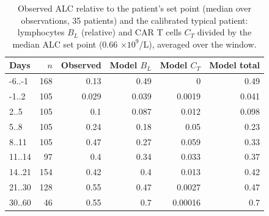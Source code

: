 \begin{table}[!htbp]
\centering
\small
\setlength{\tabcolsep}{3.5pt}
\caption{Observed ALC relative to the patient's set point (median over observations, 35 patients) and the calibrated typical patient: lymphocytes $B_L$ (relative) and CAR T cells $C_T$ divided by the median ALC set point (0.66 $\times10^9$/L), averaged over the window.}
\label{tab:alc}
\begin{tabular}{lrrrrr}
\toprule
Days & $n$ & Observed & Model $B_L$ & Model $C_T$ & Model total \\
\midrule
-6..-1 & 168 & 0.13 & 0.49 & 0 & 0.49 \\
-1..2 & 105 & 0.029 & 0.039 & 0.0019 & 0.041 \\
2..5 & 105 & 0.1 & 0.087 & 0.012 & 0.098 \\
5..8 & 105 & 0.24 & 0.18 & 0.05 & 0.23 \\
8..11 & 105 & 0.47 & 0.27 & 0.059 & 0.33 \\
11..14 & 97 & 0.4 & 0.34 & 0.033 & 0.37 \\
14..21 & 154 & 0.42 & 0.4 & 0.013 & 0.42 \\
21..30 & 128 & 0.55 & 0.47 & 0.0027 & 0.47 \\
30..60 & 46 & 0.55 & 0.7 & 0.00016 & 0.7 \\
\bottomrule
\end{tabular}
\end{table}
